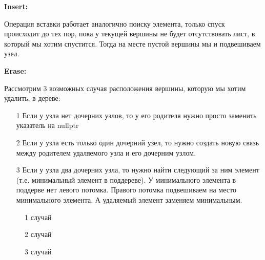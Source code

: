 \textbf{Insert: }

Операция вставки работает аналогично поиску элемента, только спуск происходит до тех пор, пока у текущей вершины не будет  отсутствовать лист, в который мы хотим спустится. Тогда на месте пустой вершины мы и подвешиваем узел.

\textbf{Erase: }

Рассмотрим 3 возможных случая расположения вершины, которую мы хотим удалить, в дереве:
\begin{itemize}
    \item[1] Если у узла нет дочерних узлов, то у его родителя нужно просто заменить указатель на nullptr
    \item[2]  Если у узла есть только один дочерний узел, то нужно создать новую связь между родителем удаляемого узла и его дочерним узлом.
    \item[3] Если у узла два дочерних узла, то нужно найти следующий за ним элемент (т.е. минимальный элемент в поддереве). У минимального элемента в поддерве нет левого потомка. Правого потомка подвешиваем на место минимального элемента. А удаляемый элемент заменяем минимальным. 
      \end{itemize}
   
\begin{figure}[h]
\caption {1 случай}
\end{figure}
\begin{figure}[h]
\caption {2 случай}
\end{figure}
\begin{figure}[h]
\caption {3 случай}
\label{ris:image}
\end{figure}

